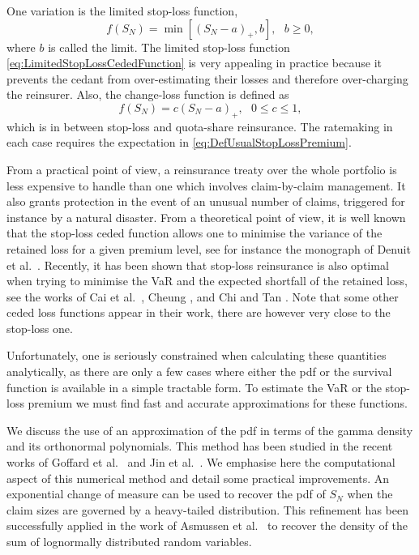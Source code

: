 One variation is the limited stop-loss function,
\begin{equation}\label{eq:LimitedStopLossCededFunction}
f(S_N)=\min[(S_N-a)_{+},b],\text{ }b\geq0,
\end{equation}
where $b$ is called the limit. The limited stop-loss function \eqref{eq:LimitedStopLossCededFunction} is very appealing in practice because it prevents the cedant from over-estimating their losses and therefore over-charging the reinsurer.
Also, the change-loss function is defined as
\begin{equation*}\label{eq:ChangeLossCededFunction}
f(S_N)=c(S_N-a)_{+},\text{ }0\leq c\leq1,
\end{equation*}
which is in between stop-loss and quota-share reinsurance. The ratemaking in each case requires the expectation in \eqref{eq:DefUsualStopLossPremium}.

From a practical point of view, a reinsurance treaty over the whole portfolio is less expensive to handle than one which involves claim-by-claim management. It also grants protection in the event of an unusual number of claims, triggered for instance by a natural disaster. From a theoretical point of view, it is well known that the stop-loss ceded function allows one to minimise the variance of the retained loss for a given premium level, see for instance the monograph of Denuit et al.\ \cite{DeDhGoKa06}. Recently, it has been shown that stop-loss reinsurance is also optimal when trying to minimise the VaR and the expected shortfall of the retained loss, see the works of Cai et al.\ \cite{CaTaWeZh08}, Cheung \cite{Ch10}, and Chi and Tan \cite{ChTa11}. Note that some other ceded loss functions appear in their work, there are however very close to the stop-loss one.

Unfortunately, one is seriously constrained when calculating these quantities analytically, as there are only a few cases where either the pdf or the survival function is available in a simple tractable form. To estimate the VaR or the stop-loss premium we must find fast and accurate approximations for these functions.

We discuss the use of an approximation of the pdf in terms of the gamma density and its orthonormal polynomials. This method has been studied in the recent works of Goffard et al.\ \cite{GoLoPo15} and Jin et al.\ \cite{JiPrRe16}. We emphasise here the computational aspect of this numerical method and detail some practical improvements. An exponential change of measure can be used to recover the pdf of $S_N$ when the claim sizes are governed by a heavy-tailed distribution. This refinement has been successfully applied in the work of Asmussen et al.\ \cite{asmussen2016orthonormal} to recover the density of the sum of lognormally distributed random variables.

